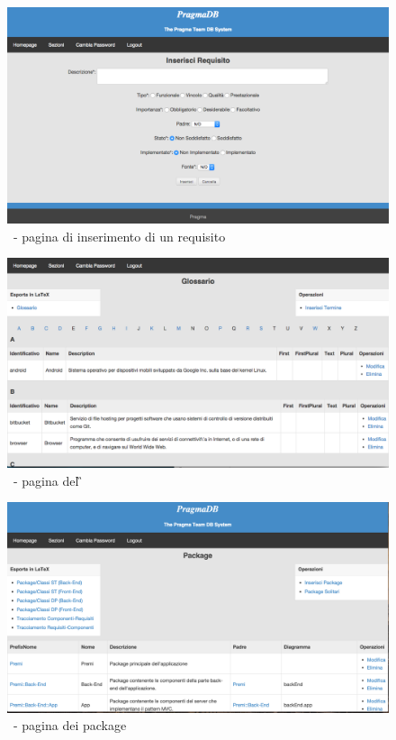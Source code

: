 \begin{figure}[h]
\centering
\includegraphics[width=\textwidth,keepaspectratio]{../immagini/insertReq.png}
\caption{\pragmadb\ - pagina di inserimento di un requisito}\label{fig: PDBInsert}
\end{figure}
\begin{figure}[h]
\centering
\includegraphics[width=\textwidth,keepaspectratio]{../immagini/glossario.png}
\caption{\pragmadb\ - pagina del \G}\label{fig: PDBGlossario}
\end{figure}
\begin{figure}[h]
\centering
\includegraphics[width=\textwidth,keepaspectratio]{../immagini/pragmadbPackage.png}
\caption{\pragmadb\ - pagina dei package}\label{fig: PDBGlossario}
\end{figure}
